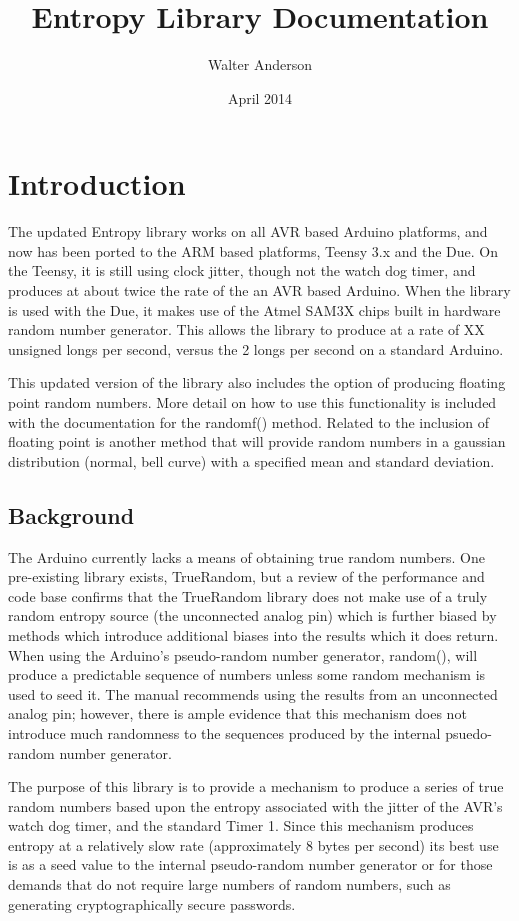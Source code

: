 \documentclass[10pt]{report}
\title{Entropy Library Documentation}
\author{Walter Anderson}
\date{April 2014}
\begin{document}
\maketitle
\tableofcontents
\chapter{Introduction}
\setcounter{page}{1}
The updated Entropy library works on all AVR based Arduino platforms, and now has been ported to the ARM based 
platforms, Teensy 3.x and the Due.  On the Teensy, it is still using clock jitter, though not the watch dog 
timer, and produces at about twice the rate of the an AVR based Arduino.  When the library is used with the 
Due, it makes use of the Atmel SAM3X chips built in hardware random number generator.  This allows the library 
to produce at a rate of XX unsigned longs per second, versus the 2 longs per second on a standard Arduino.

This updated version of the library also includes the option of producing floating point random numbers.  More 
detail on how to use this functionality is included with the documentation for the randomf() method.  Related
to the inclusion of floating point is another method that will provide random numbers in a gaussian distribution
(normal, bell curve) with a specified mean and standard deviation.
\section{Background}
The Arduino currently lacks a means of obtaining true random numbers.  One pre-existing library exists, 
TrueRandom, but a review of the performance and code base confirms that the TrueRandom library does not make 
use of a truly random entropy source (the unconnected analog pin) \cite{Krisston2011} which is further biased 
by methods which introduce additional biases into the results which it does return.  When using the Arduino's 
pseudo-random number generator, random(), will produce a predictable sequence of numbers unless some random 
mechanism is used to seed it.  The manual recommends using the results from an unconnected analog pin; however,
there is ample evidence that this mechanism does not introduce much randomness to the sequences produced by 
the internal psuedo-random number generator.

The purpose of this library is to provide a mechanism to produce a series of true random numbers based upon 
the entropy associated with the jitter of the AVR's watch dog timer, and the standard Timer 1. 
\cite{Pedersen2006} Since this mechanism produces entropy at a relatively slow rate (approximately 8 bytes 
per second) its best use is as a seed value to the internal pseudo-random number generator or for those 
demands that do not require large numbers of random numbers, such as generating cryptographically secure 
passwords. \cite{Hlavac2010}
\end{document}
